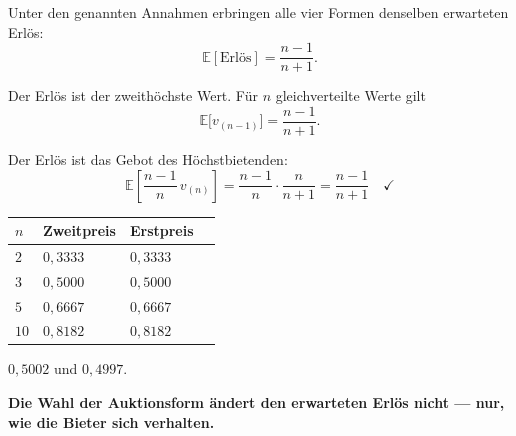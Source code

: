 \begin{merksatz}
Unter den genannten Annahmen erbringen alle vier Formen denselben erwarteten Erlös:
\[ \mathbb{E}[\text{Erlös}] = \frac{n-1}{n+1} . \]

Der Erlös ist der zweithöchste Wert. Für $n$ gleichverteilte Werte gilt
\[ \mathbb{E}\bigl[v_{(n-1)}\bigr] = \frac{n-1}{n+1} . \]

Der Erlös ist das Gebot des Höchstbietenden:
\[ \mathbb{E}\left[\frac{n-1}{n}\,v_{(n)}\right] = \frac{n-1}{n}\cdot\frac{n}{n+1} = \frac{n-1}{n+1} \quad \checkmark \]

\begin{center}
{\small
\renewcommand{\arraystretch}{1.48}
\begin{tabular}{@{}P{1.6cm}P{2.0cm}P{2.0cm}P{1.8cm}@{}}
\toprule
$n$ & \textbf{Zweitpreis} & \textbf{Erstpreis} & \\
\midrule
$2$ & $0{,}3333$ & $0{,}3333$ & \\
$3$ & $0{,}5000$ & $0{,}5000$ & \\
$5$ & $0{,}6667$ & $0{,}6667$ & \\
$10$ & $0{,}8182$ & $0{,}8182$ & \\
\bottomrule
\end{tabular}}
\end{center}

 $0{,}5002$ und $0{,}4997$. \checkmark

\begin{center}
\begin{minipage}{0.9\textwidth}
\textbf{Die Wahl der Auktionsform ändert den erwarteten Erlös nicht --- nur, wie die Bieter sich verhalten.}
\end{minipage}
\end{center}

\begin{center}
\begin{minipage}{0.88\textwidth}
\end{minipage}
\end{center}
\end{merksatz}

